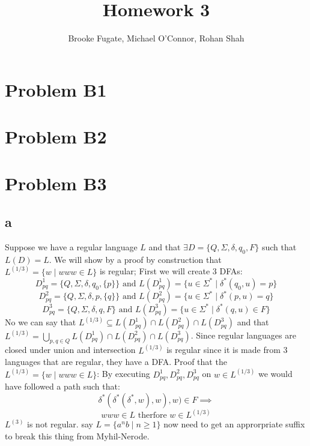 \documentclass[12pt]{article}
\begin{document}
\pagestyle{plain}
\titleformat{\subsection}[runin]
  {\normalfont\large\bfseries}{\thesubsection}{1em}{}

\title{Homework 3}
\author{Brooke Fugate, Michael O'Connor, Rohan Shah}
\date{}

\maketitle

\section*{Problem B1}

\section*{Problem B2}

\section*{Problem B3}
\subsection*{a}
Suppose we have a regular language $L$ and that $\exists    D = \{Q, \Sigma, \delta, q_0, F\}$ such that $L(D) = L$. We will show by a proof by construction that $L^{(1/3)} = \{ w \mid www \in L\}$ is regular; \newline First we will create 3 DFAs:
$$D^1_{pq} = \{Q, \Sigma, \delta, q_0, \{p\}\} \text{ and } L(D^1_{pq}) = \{u \in \Sigma^* \mid \delta^* (q_0,u) = p\}$$
$$D^2_{pq} = \{Q, \Sigma, \delta, p, \{q\}\} \text{ and } L(D^2_{pq}) = \{u \in \Sigma^* \mid \delta^* (p,u) = q\}$$
$$D^3_{pq} = \{Q, \Sigma, \delta, q, F\} \text{ and } L(D^3_{pq}) = \{u \in \Sigma^* \mid \delta^* (q,u) \in F\}$$
No we can say that $L^{(1/3)} \subseteq L(D^1_{pq}) \cap L(D^2_{pq}) \cap L(D^3_{pq})$ and that $L^{(1/3)} = \bigcup_{p,q \in Q}  L(D^1_{pq}) \cap L(D^2_{pq}) \cap L(D^3_{pq})$.  Since regular languages are closed under union and intersection $L^{(1/3)}$ is regular since it is made from 3 languages that are regular, they have a DFA. \newline
Proof that the $L^{(1/3)} = \{ w \mid www \in L\}$:\newline
By executing  $D^1_{pq} , D^2_{pq} , D^3_{pq}$ on $w \in L^{(1/3)}$ we would have followed a path such that:
$$\delta^*(\delta^*(\delta^*, w), w), w) \in F \implies$$
$$www \in L \text{ therfore }w \in L^{(1/3)}$$
\newline $L^{(3)}$ is not regular. say $L = \{a^nb \mid n \ge 1\}$ now need to get an approrpriate suffix to break this thing from Myhil-Nerode.
\end{document}
